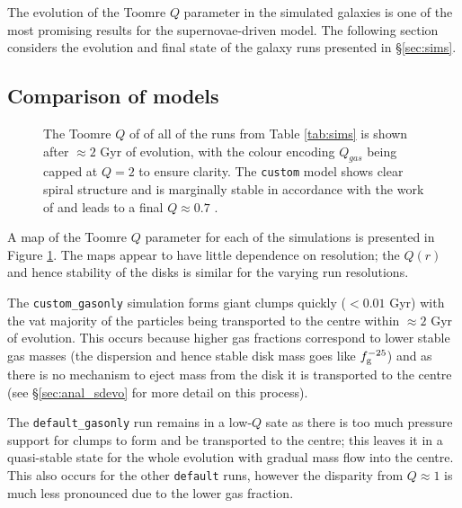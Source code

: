The evolution of the Toomre $Q$ parameter in the simulated galaxies is one of the most promising results for the supernovae-driven model.
The following section considers the evolution and final state of the galaxy runs presented in \S \ref{sec:sims}.

\subsection{Comparison of models}

\begin{figure}[!ht]
    \leavevmode\rlap{\usebox{\graphicsbox}}%
    \begin{minipage}[b]{0.63\wd\graphicsbox}%
        \caption{The Toomre $Q$ of of all of the runs from Table \ref{tab:sims} is shown after $\approx 2$ Gyr of evolution, with the colour encoding $Q_{gas}$ being capped at $Q=2$ to ensure clarity. The {\tt custom} model shows clear spiral structure and is marginally stable in accordance with the work of \citet{hopkins_stellar_2012} and leads to a final $Q \approx 0.7$ \citep{behrendt_structure_2015}.}
        \label{fig:toomqsimbigfig}
    \end{minipage}\hspace*{0.33\wd\graphicsbox}%
\end{figure}

A map of the Toomre $Q$ parameter for each of the simulations is presented in Figure \ref{fig:toomqsimbigfig}.
The maps appear to have little dependence on resolution; the $Q(r)$ and hence stability of the disks is similar for the varying run resolutions.

The {\tt custom\_gasonly} simulation forms giant clumps quickly ($<0.01$ Gyr) with the vat majority of the particles being transported to the centre within $\approx 2$ Gyr of evolution.
This occurs because higher gas fractions correspond to lower stable gas masses (the dispersion and hence stable disk mass goes like $f_\mathrm{g}^{-25}$) and as there is no mechanism to eject mass from the disk it is transported to the centre (see \S \ref{sec:anal_sdevo} for more detail on this process).

The {\tt default\_gasonly} run remains in a low-$Q$ sate as there is too much pressure support for clumps to form and be transported to the centre; this leaves it in a quasi-stable state for the whole evolution with gradual mass flow into the centre.
This also occurs for the other {\tt default} runs, however the disparity from $Q \approx 1$ is much less pronounced due to the lower gas fraction.

